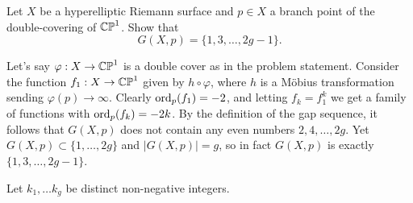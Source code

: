 \documentclass[expanded]{lkx_pset}
\begin{document}
\begin{problem}{2}
Let $X$ be a hyperelliptic Riemann surface and $p\in X$ a branch  point of
the double-covering of $\mathbb{CP}^{1}$.
Show that \[G(X,p) = \{1,3, \dots, 2g-1\}.\]

\end{problem}

\begin{solution}
	Let's say $\varphi : X \to \mathbb{CP}^1$ is a double cover as in the problem statement.
	Consider the function $f_1 : X \to \mathbb{CP}^1$ given by $h\circ \varphi$, where $h$ is a M\"obius transformation sending $\varphi(p)\to \infty$. Clearly $\mathrm{ord}_p(f_1)=-2$, and letting $f_k = f_1^k$ we get a family of functions with $\mathrm{ord}_p(f_k)=-2k$.
	By the definition of the gap sequence, it follows that $G(X,p)$ does not contain any even numbers $2,4,\ldots, 2g$. Yet $G(X,p)\subset \{1,\ldots, 2g\}$ and $|G(X,p)|=g$, so in fact $G(X,p)$ is exactly $\{1,3,\ldots, 2g-1\}$.
\end{solution}

\begin{problem}{3}
Let $k_{1}, \dots k_{g}$ be distinct non-negative integers.
\end{problem}
\end{document}
